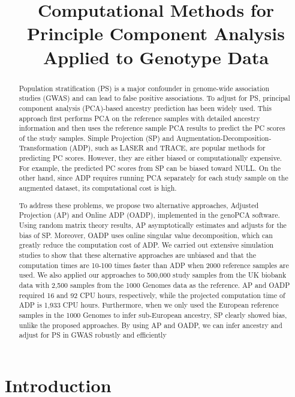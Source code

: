 \documentclass{article}
\title{Computational Methods for Principle Component Analysis Applied to
  Genotype Data}
\date{}
\begin{document}
\maketitle

\begin{abstract}
    
 Population stratification (PS) is a major confounder in genome-wide association studies (GWAS) and can lead to false positive associations. To adjust for PS, principal component analysis (PCA)-based ancestry prediction has been widely used. This approach first performs PCA on the reference samples with detailed ancestry information and then uses the reference sample PCA results to predict the PC scores of the study samples. Simple Projection (SP) and Augmentation-Decomposition-Transformation (ADP), such as LASER and TRACE, are popular methods for predicting PC scores. However, they are either biased or computationally expensive. For example, the predicted PC scores from SP can be biased toward NULL. On the other hand, since ADP requires running PCA separately for each study sample on the augmented dataset, its computational cost is high.

To address these problems, we propose two alternative approaches, Adjusted Projection (AP) and Online ADP (OADP), implemented in the genoPCA software. Using random matrix theory results, AP asymptotically estimates and adjusts for the bias of SP. Moreover, OADP uses online singular value decomposition, which can greatly reduce the computation cost of ADP. We carried out extensive simulation studies to show that these alternative approaches are unbiased and that the computation times are 10-100 times faster than ADP when 2000 reference samples are used. We also applied our approaches to 500,000 study samples from the UK biobank data with 2,500 samples from the 1000 Genomes data as the reference. AP and OADP required 16 and 92 CPU hours, respectively, while the projected computation time of ADP is 1,933 CPU hours. Furthermore, when we only used the European reference samples in the 1000 Genomes to infer sub-European ancestry, SP clearly showed bias, unlike the proposed approaches. By using AP and OADP, we can infer ancestry and adjust for PS in GWAS robustly and efficiently   
    
\end{abstract}

\section{Introduction}
\end{document}
